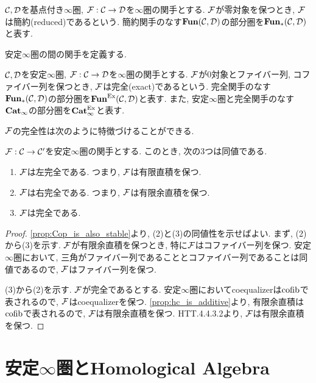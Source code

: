\documentclass[uplatex, a4paper, 14Q, dvipdfmx]{jsarticle}
\begin{document}
\begin{definition}[簡約関手]
  $\mathcal{C},\mathcal{D}$を基点付き$\infty$圏, $\mathcal{F} : \mathcal{C} \to \mathcal{D}$を$\infty$圏の関手とする. 
  $\mathcal{F}$が零対象を保つとき, $\mathcal{F}$は簡約(reduced)であるという.
  簡約関手のなす$\mathbf{Fun}(\mathcal{C},\mathcal{D})$の部分圏を$\mathbf{Fun}_\ast(\mathcal{C},\mathcal{D})$と表す. 
\end{definition}

安定$\infty$圏の間の関手を定義する. 

\begin{definition}[完全関手]
  $\mathcal{C},\mathcal{D}$を安定$\infty$圏, $\mathcal{F} : \mathcal{C} \to \mathcal{D}$を$\infty$圏の関手とする.
  $\mathcal{F}$が$0$対象とファイバー列, コファイバー列を保つとき, $\mathcal{F}$は完全(exact)であるという.
  完全関手のなす$\mathbf{Fun}_\ast(\mathcal{C},\mathcal{D})$の部分圏を$\mathbf{Fun}^{\mathrm{Ex}}(\mathcal{C},\mathcal{D})$と表す. 
  また, 安定$\infty$圏と完全関手のなす$\mathbf{Cat}_\infty$の部分圏を$\mathbf{Cat}^{\mathrm{Ex}}_\infty$と表す. 
\end{definition}

$\mathcal{F}$の完全性は次のように特徴づけることができる. 

\begin{proposition}
  $\mathcal{F} : \mathcal{C} \to \mathcal{C}'$を安定$\infty$圏の関手とする. 
  このとき, 次の3つは同値である. 
  \begin{enumerate}
    \item $\mathcal{F}$は左完全である. つまり, $\mathcal{F}$は有限直積を保つ.
    \item $\mathcal{F}$は右完全である. つまり, $\mathcal{F}$は有限余直積を保つ.
    \item $\mathcal{F}$は完全である.
  \end{enumerate}
\end{proposition}

\begin{proof}
  \cref{prop:Cop_is_also_stable}より, (2)と(3)の同値性を示せばよい. 
  まず, (2)から(3)を示す. 
  $\mathcal{F}$が有限余直積を保つとき, 特に$\mathcal{F}$はコファイバー列を保つ. 
  安定$\infty$圏において, 三角がファイバー列であることとコファイバー列であることは同値であるので, $\mathcal{F}$はファイバー列を保つ. 

  (3)から(2)を示す.
  $\mathcal{F}$が完全であるとする. 
  安定$\infty$圏においてcoequalizerは$\mathrm{cofib}$で表されるので, $\mathcal{F}$はcoequalizerを保つ.
  \cref{prop:hc_is_additive}より, 有限余直積は$\mathrm{cofib}$で表されるので, $\mathcal{F}$は有限余直積を保つ. 
  HTT.4.4.3.2より, $\mathcal{F}$は有限余直積を保つ. 
\end{proof}


\section{安定\texorpdfstring{$\infty$}{infty}圏とHomological Algebra}
\end{document}
